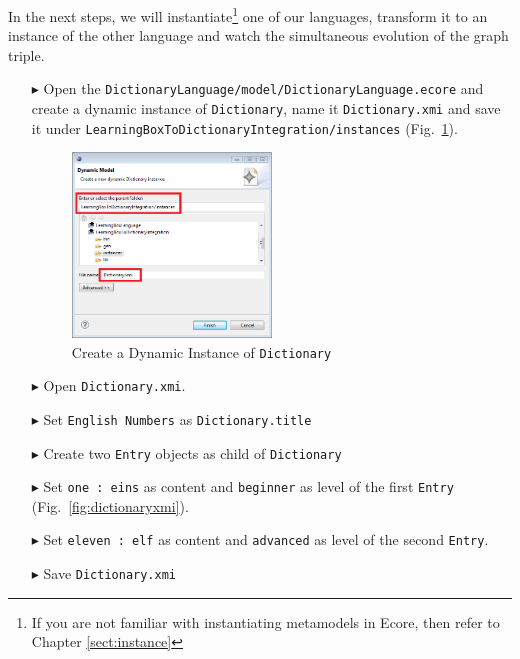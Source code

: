 In the next steps, we will instantiate\footnote{If you are not familiar with instantiating metamodels in Ecore, then refer to Chapter \ref{sect:instance}} one of our languages, transform it to an instance of the other language and watch the simultaneous evolution of the graph triple.

\begin{enumerate}
\item[$\blacktriangleright$] Open the \texttt{Dictionary\-Language/model/Dictionary\-Language.ecore} and create a dynamic instance of \texttt{Dictionary}, name it \texttt{Dictionary.xmi} and save it under \texttt{Learning\-Box\-To\-Dictionary\-Integration/instances} (Fig.~\ref{fig:create_instance_dict}).

\begin{figure}[htbp]
\begin{center}
  \includegraphics[width=0.5\textwidth]{pics/tggBilder/transformation/tgg24}
  \caption{Create a Dynamic Instance of \texttt{Dictionary}}  
  \label{fig:create_instance_dict}
\end{center}
\end{figure} 

\item[$\blacktriangleright$] Open \texttt{Dictionary.xmi}.
\item[$\blacktriangleright$] Set \texttt{English Numbers} as \texttt{Dictionary.title}
\item[$\blacktriangleright$] Create two \texttt{Entry} objects as child of \texttt{Dictionary}
\item[$\blacktriangleright$] Set \texttt{one : eins} as content and \texttt{beginner} as level of the first \texttt{Entry} (Fig.~\ref{fig:dictionaryxmi}).
\item[$\blacktriangleright$] Set \texttt{eleven : elf} as content and \texttt{advanced} as level of the second \texttt{Entry}.
\item[$\blacktriangleright$] Save \texttt{Dictionary.xmi}


\end{enumerate}

